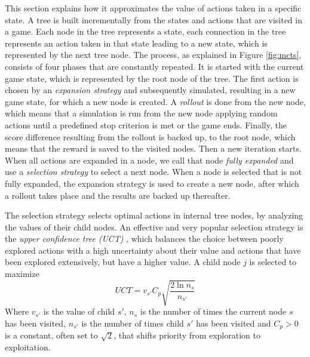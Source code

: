 This section explains how it approximates the value of actions taken in a
specific state. A tree is built incrementally from the states and actions that
are visited in a game. Each node in the tree represents a state, each connection
in the tree represents an action taken in that state leading to a new state,
which is represented by the next tree node.  The process, as explained in Figure
\ref{fig:mcts}, consists of four phases that are constantly repeated. It is
started with the current game state, which is represented by the root node of
the tree. The first action is chosen by an \emph{expansion strategy} and
subsequently simulated, resulting in a new game state, for which a new node is
created. A \emph{rollout} is done from the new node, which means that a
simulation is run from the new node applying random actions until a predefined
stop criterion is met or the game ends. Finally, the score difference resulting
from the rollout is backed up, to the root node, which means that the reward is
saved to the visited nodes. Then a new iteration starts. When all actions are
expanded in a node, we call that node \emph{fully expanded} and use a
\emph{selection strategy} to select a next node. When a node is selected that is
not fully expanded, the expansion strategy is used to create a new node, after
which a rollout takes place and the results are backed up thereafter.

The selection strategy selects optimal actions in internal tree nodes, by
analyzing the values of their child nodes. An effective and very popular
selection strategy is the \emph{upper confidence tree (UCT)}
\cite{kocsis2006bandit}, which balances the choice between poorly explored
actions with a high uncertainty about their value and actions that have been
explored extensively, but have a higher value. A child node $j$ is selected to
maximize
\begin{equation}
	\label{eq:uct}
	UCT = v_{s'} C_p \sqrt{\frac{2 \ln n_s}{n_{s'}}}
\end{equation}
Where $v_{s'}$ is the value of child $s'$, $n_s$ is the number of times the current node $s$ has been visited,
$n_{s'}$ is the number of times child $s'$ has been visited and $C_p > 0$ is a
constant, often set to $\sqrt{2}$, that shifts priority from exploration to
exploitation.

